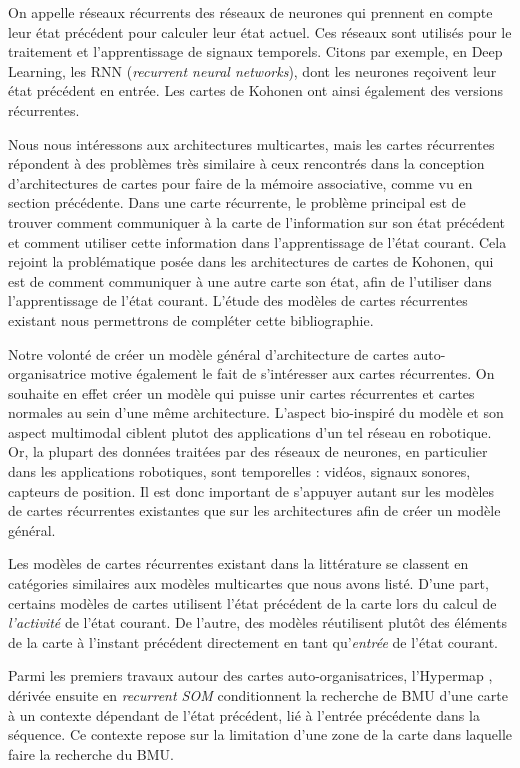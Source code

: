 \documentclass[../main]{subfiles}
\begin{document}
On appelle réseaux récurrents des réseaux de neurones qui prennent en compte leur état précédent pour calculer leur état actuel. Ces réseaux sont utilisés pour le traitement et l'apprentissage de signaux temporels. Citons par exemple, en Deep Learning, les RNN (\emph{recurrent neural networks}), dont les neurones reçoivent leur état précédent en entrée. Les cartes de Kohonen ont ainsi également des versions récurrentes.

Nous nous intéressons aux architectures multicartes, mais les cartes récurrentes répondent à des problèmes très similaire à ceux rencontrés dans la conception d'architectures de cartes pour faire de la mémoire associative, comme vu en section précédente.
Dans une carte récurrente, le problème principal est de trouver comment communiquer à la carte de l'information sur son état précédent et comment utiliser cette information dans l'apprentissage de l'état courant. Cela rejoint la problématique posée dans les architectures de cartes de Kohonen, qui est de comment communiquer à une autre carte son état, afin de l'utiliser dans l'apprentissage de l'état courant. L'étude des modèles de cartes récurrentes existant nous permettrons de compléter cette bibliographie. 

Notre volonté de créer un modèle général d'architecture de cartes auto-organisatrice motive également le fait de s'intéresser aux cartes récurrentes. On souhaite en effet créer un modèle qui puisse unir cartes récurrentes et cartes normales au sein d'une même architecture. L'aspect bio-inspiré du modèle et son aspect multimodal ciblent plutot des applications d'un tel réseau en robotique. Or, la plupart des données traitées par des réseaux de neurones, en particulier dans les applications robotiques, sont temporelles : vidéos, signaux sonores, capteurs de position. Il est donc important de s'appuyer autant sur les modèles de cartes récurrentes existantes que sur les architectures afin de créer un modèle général.

Les modèles de cartes récurrentes existant dans la littérature se classent en catégories similaires aux modèles multicartes que nous avons listé.
D'une part, certains modèles de cartes utilisent l'état précédent de la carte lors du calcul de \emph{l'activité} de l'état courant. De l'autre, des modèles réutilisent plutôt des éléments de la carte à l'instant précédent directement en tant qu'\emph{entrée} de l'état courant.


Parmi les premiers travaux autour des cartes auto-organisatrices, l'Hypermap \cite{Kohonen1991THEHA}, dérivée ensuite en \emph{recurrent SOM} \cite{varsta_temporal_2001} conditionnent la recherche de BMU d'une carte à un contexte dépendant de l'état précédent, lié à l'entrée précédente dans la séquence. Ce contexte repose sur la limitation d'une zone de la carte dans laquelle faire la recherche du BMU. 
\end{document}
